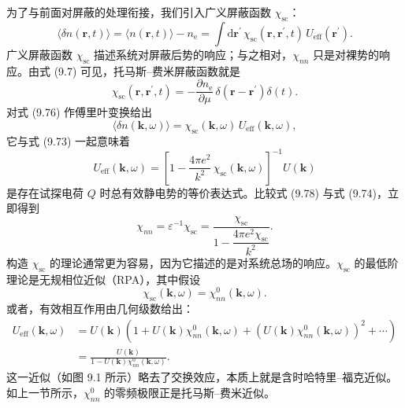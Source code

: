 为了与前面对屏蔽的处理衔接，我们引入广义屏蔽函数 $\chi_{\mathrm{sc}}$：
\begin{equation*}
\langle\delta n(\mathbf{r},t)\rangle=\langle n(\mathbf{r},t)\rangle-n_{\mathrm{e}}=\int\mathrm{d}\mathbf{r}^{\prime}\,\chi_{\mathrm{sc}}(\mathbf{r},\mathbf{r}^{\prime},t)\,U_{\mathrm{eff}}(\mathbf{r}^{\prime}).\tag{9.76}
\end{equation*}
广义屏蔽函数 $\chi_{\mathrm{sc}}$ 描述系统对屏蔽后势的响应；与之相对，$\chi_{nn}$ 只是对裸势的响应。由式 (9.7) 可见，托马斯–费米屏蔽函数就是
\begin{equation*}
\chi_{\mathrm{sc}}(\mathbf{r},\mathbf{r}^{\prime},t)=-\frac{\partial n_{\mathrm{e}}}{\partial\mu}\,\delta\left(\mathbf{r}-\mathbf{r}^{\prime}\right)\delta(t).\tag{9.77}
\end{equation*}
对式 (9.76) 作傅里叶变换给出
\begin{equation*}
\langle\delta n(\mathbf{k},\omega)\rangle=\chi_{\mathrm{sc}}(\mathbf{k},\omega)\,U_{\mathrm{eff}}(\mathbf{k},\omega),\tag{9.78}
\end{equation*}
它与式 (9.73) 一起意味着
\begin{equation*}
U_{\mathrm{eff}}(\mathbf{k},\omega)=\left[1-\frac{4\pi e^2}{k^2}\,\chi_{\mathrm{sc}}(\mathbf{k},\omega)\right]^{-1}U(\mathbf{k})\tag{9.79}
\end{equation*}
是存在试探电荷 $Q$ 时总有效静电势的等价表达式。比较式 (9.78) 与式 (9.74)，立即得到
\begin{equation*}
\chi_{nn}=\varepsilon^{-1}\chi_{\mathrm{sc}}=\frac{\chi_{\mathrm{sc}}}{1-\dfrac{4\pi e^2\chi_{\mathrm{sc}}}{k^2}}.\tag{9.80}
\end{equation*}
构造 $\chi_{\mathrm{sc}}$ 的理论通常更为容易，因为它描述的是对系统总场的响应。$\chi_{\mathrm{sc}}$ 的最低阶理论是无规相位近似（RPA），其中假设
\begin{equation*}
\chi_{\mathrm{sc}}(\mathbf{k},\omega)=\chi_{nn}^{0}(\mathbf{k},\omega).\tag{9.81}
\end{equation*}
或者，有效相互作用由几何级数给出：
\begin{equation*}
\begin{aligned}
U_{\mathrm{eff}}(\mathbf{k},\omega)&=U(\mathbf{k})\left(1+U(\mathbf{k})\chi_{nn}^{0}(\mathbf{k},\omega)+\left(U(\mathbf{k})\chi_{nn}^{0}(\mathbf{k},\omega)\right)^2+\cdots\right)\\
&=\frac{U(\mathbf{k})}{1-U(\mathbf{k})\chi_{nn}^{0}(\mathbf{k},\omega)}.
\end{aligned}\tag{9.82}
\end{equation*}
这一近似（如图 9.1 所示）略去了交换效应，本质上就是含时哈特里–福克近似。如上一节所示，$\chi_{nn}^{0}$ 的零频极限正是托马斯–费米近似。

